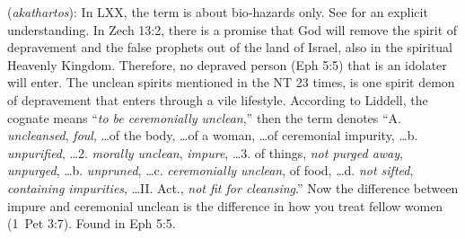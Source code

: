 \item[Depravement,]

(\textit{akathartos}):
In LXX, the term is about bio-hazards only. See  for an explicit understanding. In Zech 13:2, there is a promise that God will remove the spirit of depravement and the false prophets out of the land of Israel, also in the spiritual Heavenly Kingdom. Therefore, no depraved person (Eph 5:5) that is an idolater will enter. The unclean spirits mentioned in the NT 23 times, is one spirit demon of depravement that enters through a vile lifestyle. According to Liddell, the cognate  means ``\emph{to be ceremonially unclean},'' then the term  denotes ``A. \emph{uncleansed}, \emph{foul}, \ldots of the body, \ldots of a woman, \ldots of ceremonial impurity, \ldots b. \emph{unpurified}, \ldots 2. \emph{morally unclean}, \emph{impure}, \ldots 3. of things, \emph{not purged away}, \emph{unpurged}, \ldots b. \emph{unpruned}, \ldots c. \emph{ceremonially unclean}, of food, \ldots d. \emph{not sifted}, \emph{containing impurities}, \ldots II. Act., \emph{not fit for cleansing}.'' 
Now the difference between impure and ceremonial unclean is the difference in how you treat fellow women (1~Pet 3:7).
Found in Eph 5:5.
